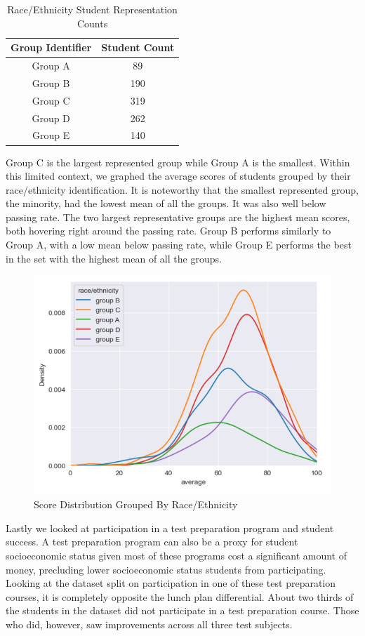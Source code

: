 \documentclass[doc]{apa6} %
\begin{document}
\begin{table}[H]
    \centering
    \begin{tabular}{|c|c|}
    \hline
         Group Identifier & Student Count\\
         \hline\hline
         Group A & 89\\
         \hline
         Group B & 190\\
         \hline
         Group C & 319\\
         \hline
         Group D & 262\\
         \hline
         Group E & 140\\
         \hline
    \end{tabular}
    \caption{Race/Ethnicity Student Representation Counts}
    \label{tab:RaceCount}
\end{table}
Group C is the largest represented group while Group A is the smallest. Within this limited context, we graphed the average scores of students grouped by their race/ethnicity identification. It is noteworthy that the smallest represented group, the minority, had the lowest mean of all the groups. It was also well below passing rate.  The two largest representative groups are the highest mean scores, both hovering right around the passing rate. Group B performs similarly to Group A, with a low mean below passing rate, while Group E performs the best in the set with the highest mean of all the groups. 

\begin{figure}[H]
    \centering
    \includegraphics[width=0.5\linewidth]{RaceScoreDistribution.png}
    \caption{Score Distribution Grouped By Race/Ethnicity}
    \label{fig:RaceScores}
\end{figure}

Lastly we looked at participation in a test preparation program and student success.  A test preparation program can also be a proxy for student socioeconomic status given most of these programs cost a significant amount of money, precluding lower socioeconomic status students from participating.
Looking at the dataset split on participation in one of these test preparation courses, it is completely opposite the lunch plan differential. About two thirds of the students in the dataset did not participate in a test preparation course.  Those who did, however, saw improvements across all three test subjects.
\end{document}

